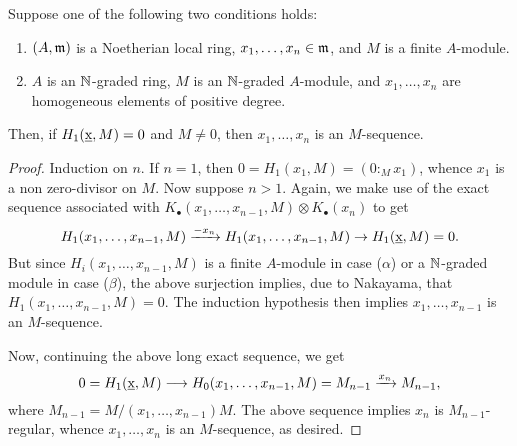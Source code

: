 \begin{theorem}
    Suppose one of the following two conditions holds: 
    \begin{enumerate}[label=(\greek*)]
        \item $(A,\mathfrak{m})$ is a Noetherian local ring, $x_1,\dots,x_n\in\mathfrak{m}$, and $M$ is a finite $A$-module. 
        \item $A$ is an $\mathbb{N}$-graded ring, $M$ is an $\mathbb{N}$-graded $A$-module, and $x_1,\dots,x_n$ are homogeneous elements of positive degree.
    \end{enumerate}
    Then, if $H_1(\underbar{x}, M) = 0$ and $M\ne 0$, then $x_1,\dots,x_n$ is an $M$-sequence.
\end{theorem}
\begin{proof}
    Induction on $n$. If $n = 1$, then $0 = H_1(x_1, M) = (0 :_M x_1)$, whence $x_1$ is a non zero-divisor on $M$. Now suppose $n > 1$. Again, we make use of the exact sequence associated with $K_\bullet(x_1,\dots,x_{n - 1}, M)\otimes K_\bullet(x_n)$ to get 
    \begin{equation*}
        H_1(x_1,\dots,x_{n - 1}, M)\xrightarrow{-x_n}H_1(x_1,\dots,x_{n - 1}, M)\to H_1(\underbar{x}, M) = 0.
    \end{equation*}
    But since $H_i(x_1,\dots,x_{n - 1}, M)$ is a finite $A$-module in case ($\alpha$) or a $\mathbb{N}$-graded module in case ($\beta$), the above surjection implies, due to Nakayama, that $H_1(x_1,\dots,x_{n - 1}, M) = 0$. The induction hypothesis then implies $x_1,\dots,x_{n - 1}$ is an $M$-sequence.

    Now, continuing the above long exact sequence, we get 
    \begin{equation*}
        0 = H_1(\underbar{x}, M)\longrightarrow H_0(x_1,\dots,x_{n - 1}, M) = M_{n - 1}\xrightarrow{x_n} M_{n - 1},
    \end{equation*}
    where $M_{n - 1} = M/(x_1,\dots,x_{n - 1})M$. The above sequence implies $x_n$ is $M_{n - 1}$-regular, whence $x_1,\dots,x_n$ is an $M$-sequence, as desired.
\end{proof}

